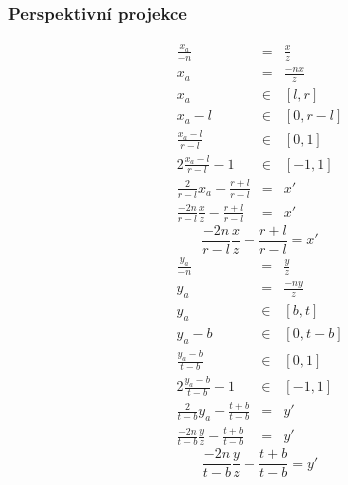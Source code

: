 \begin{frame}
\frametitle{Perspektivní projekce}
\begin{multicols}{2}
{\tiny
\begin{eqnarray*}
	\frac{x_a}{-n} &=& \frac{x}{z} \\
	x_a &=& \frac{-nx}{z} \\
	x_a &\in& [l,r] \\
	x_a-l &\in& [0,r-l] \\
	\frac{x_a-l}{r-l} &\in& [0,1] \\
	2\frac{x_a-l}{r-l}-1 &\in& [-1,1] \\
	\frac{2}{r-l}x_a-\frac{r+l}{r-l} &=& x'\\
	\frac{-2n}{r-l} \frac{x}{z} - \frac{r+l}{r-l} &=& x'
\end{eqnarray*}
\begin{equation}
\label{eq:persx}
\frac{-2n}{r-l} \frac{x}{z} - \frac{r+l}{r-l} = x'
\end{equation}
}
\vfill
{\tiny
\begin{eqnarray*}
	\frac{y_a}{-n} &=& \frac{y}{z} \\
	y_a &=& \frac{-ny}{z} \\
	y_a &\in& [b,t] \\
	y_a-b &\in& [0,t-b] \\
	\frac{y_a-b}{t-b} &\in& [0,1] \\
	2\frac{y_a-b}{t-b}-1 &\in& [-1,1] \\
	\frac{2}{t-b}y_a-\frac{t+b}{t-b} &=& y'\\
	\frac{-2n}{t-b} \frac{y}{z} - \frac{t+b}{t-b} &=& y'
\end{eqnarray*}
\begin{equation}
\label{eq:persy}
\frac{-2n}{t-b} \frac{y}{z} - \frac{t+b}{t-b} = y'
\end{equation}
}
\end{multicols}

\end{frame}

